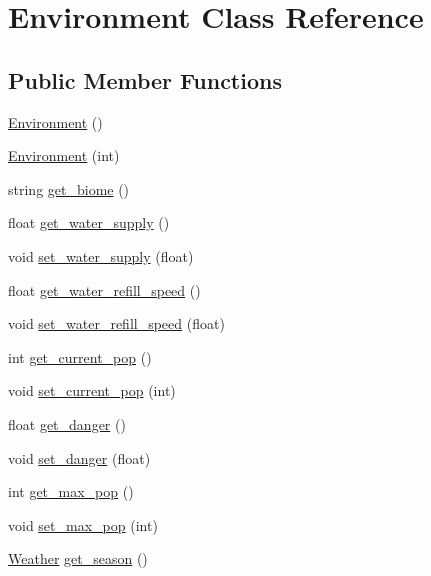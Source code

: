 \hypertarget{class_environment}{}\section{Environment Class Reference}
\label{class_environment}
\subsection*{Public Member Functions}
\begin{DoxyCompactItemize}
\item 
\hyperlink{class_environment_a8b427c4448d8b7536666837521b9e83d}{Environment} ()
\item 
\hyperlink{class_environment_a50c8eb3630e6640078ab0939ed54d7a8}{Environment} (int)
\item 
string \hyperlink{class_environment_a85caf2f76cffed1ff5f26d9f419faa34}{get\+\_\+biome} ()
\item 
float \hyperlink{class_environment_a34f8cb7070c04c78bff5a4e32e1c4529}{get\+\_\+water\+\_\+supply} ()
\item 
void \hyperlink{class_environment_a68b5b4471d4eed0e6ce5b27f3182a2c2}{set\+\_\+water\+\_\+supply} (float)
\item 
float \hyperlink{class_environment_a22323f11696c983cfb936fbc55442a5d}{get\+\_\+water\+\_\+refill\+\_\+speed} ()
\item 
void \hyperlink{class_environment_a77ef203c0aed27b0eed00d5b0d714993}{set\+\_\+water\+\_\+refill\+\_\+speed} (float)
\item 
int \hyperlink{class_environment_a5e4d853c509dc2e7d321254c0f553a6f}{get\+\_\+current\+\_\+pop} ()
\item 
void \hyperlink{class_environment_a5e18c76d6ee7629bab4b0d2800d0b0dd}{set\+\_\+current\+\_\+pop} (int)
\item 
float \hyperlink{class_environment_ade4e5787c137e4646d260198cfc4dee5}{get\+\_\+danger} ()
\item 
void \hyperlink{class_environment_aa573ecb533cea1336b6db7d983358db2}{set\+\_\+danger} (float)
\item 
int \hyperlink{class_environment_afedf443586624eaf57fa5f118295bc30}{get\+\_\+max\+\_\+pop} ()
\item 
void \hyperlink{class_environment_a12323e6c706898f120b3297582e09121}{set\+\_\+max\+\_\+pop} (int)
\item 
\hyperlink{class_weather}{Weather} \hyperlink{class_environment_a14b790bd9ce0b0a90373e852790d77bd}{get\+\_\+season} ()
\item 

\end{DoxyCompactItemize}
